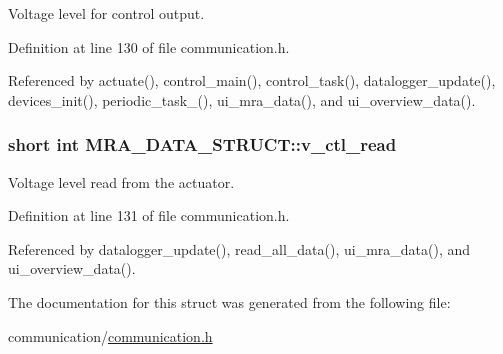 Voltage level for control output. 



Definition at line 130 of file communication.\-h.



Referenced by actuate(), control\-\_\-main(), control\-\_\-task(), datalogger\-\_\-update(), devices\-\_\-init(), periodic\-\_\-task\-\_(), ui\-\_\-mra\-\_\-data(), and ui\-\_\-overview\-\_\-data().

\hypertarget{structMRA__DATA__STRUCT_a3a31d57268c33b21ac915fdc27dfe474}{
\subsubsection[{v\-\_\-ctl\-\_\-read}]{\setlength{\rightskip}{0pt plus 5cm}short int M\-R\-A\-\_\-\-D\-A\-T\-A\-\_\-\-S\-T\-R\-U\-C\-T\-::v\-\_\-ctl\-\_\-read}}\label{structMRA__DATA__STRUCT_a3a31d57268c33b21ac915fdc27dfe474}


Voltage level read from the actuator. 



Definition at line 131 of file communication.\-h.



Referenced by datalogger\-\_\-update(), read\-\_\-all\-\_\-data(), ui\-\_\-mra\-\_\-data(), and ui\-\_\-overview\-\_\-data().



The documentation for this struct was generated from the following file\-:\begin{DoxyCompactItemize}
\item 
communication/\hyperlink{communication_8h}{communication.\-h}\end{DoxyCompactItemize}
